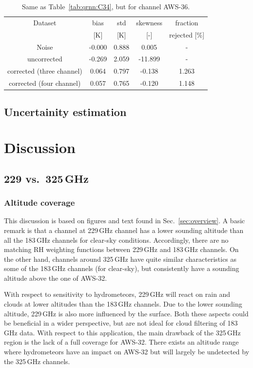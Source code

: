 \documentclass[12pt]{article}
\begin{document}
\begin{table}[!tb]
	\centering
	\begin{tabular}[b]{c|c|c|c|c}
	Dataset  		  &   bias &   std &   skewness & fraction  \\
	&   [K]  &   [K] & [-] & rejected [\%]\\
		\hline
Noise                     & -0.000 & 0.888 &              0.005 &      - \\
uncorrected               & -0.269 & 2.059 &            -11.899 &      - \\
 corrected (three channel)&  0.064 & 0.797 &             -0.138 &      1.263 \\
corrected (four channel)  &  0.057 & 0.765 &             -0.120 &      1.148 \\
		\hline
	\end{tabular}
	\caption{ Same as Table~\ref{tab:qrnn:C34}, but for channel AWS-36.}
	\label{tab:qrnn:C36}
\end{table}

\subsection{Uncertainity estimation}
\section{Discussion}

\subsection{229 vs.\ 325\,GHz}


\subsubsection{Altitude coverage}
%
This discussion is based on figures and text found in Sec.~\ref{sec:overview}.
A basic remark is that a channel at 229\,GHz channel has a lower sounding
altitude than all the 183\,GHz channels for clear-sky conditions. Accordingly,
there are no matching RH weighting functions between 229\,GHz and 183\,GHz
channels. On the other hand, channels around 325\,GHz have quite similar
characteristics as some of the 183\,GHz channels (for clear-sky), but
consistently have a sounding altitude above the one of AWS-32.

With respect to sensitivity to hydrometeors, 229\,GHz will react on rain and
clouds at lower altitudes than the 183\,GHz channels. Due to the lower sounding
altitude, 229\,GHz is also more influenced by the surface. Both these aspects
could be beneficial in a wider perspective, but are not ideal for cloud
filtering of 183\,GHz data. With respect to this application, the main drawback
of the 325\,GHz region is the lack of a full coverage for AWS-32. There exists
an altitude range where hydrometeors have an impact on AWS-32 but will largely
be undetected by the 325\,GHz channels.
\end{document}
